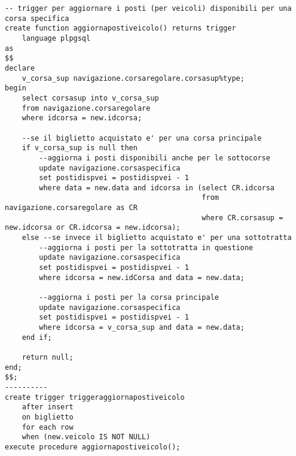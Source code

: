 \begin{lstlisting}[style = sqlstyle]
-- trigger per aggiornare i posti (per veicoli) disponibili per una corsa specifica
create function aggiornapostiveicolo() returns trigger
    language plpgsql
as
$$
declare
    v_corsa_sup navigazione.corsaregolare.corsasup%type;
begin
    select corsasup into v_corsa_sup
    from navigazione.corsaregolare
    where idcorsa = new.idcorsa;

    --se il biglietto acquistato e' per una corsa principale 
    if v_corsa_sup is null then
        --aggiorna i posti disponibili anche per le sottocorse
        update navigazione.corsaspecifica
        set postidispvei = postidispvei - 1
        where data = new.data and idcorsa in (select CR.idcorsa
                                              from navigazione.corsaregolare as CR
                                              where CR.corsasup = new.idcorsa or CR.idcorsa = new.idcorsa);
    else --se invece il biglietto acquistato e' per una sottotratta 
        --aggiorna i posti per la sottotratta in questione
        update navigazione.corsaspecifica
        set postidispvei = postidispvei - 1
        where idcorsa = new.idCorsa and data = new.data;

        --aggiorna i posti per la corsa principale
        update navigazione.corsaspecifica
        set postidispvei = postidispvei - 1
        where idcorsa = v_corsa_sup and data = new.data;
    end if;

    return null;
end;
$$;
----------
create trigger triggeraggiornapostiveicolo
    after insert
    on biglietto
    for each row
    when (new.veicolo IS NOT NULL)
execute procedure aggiornapostiveicolo();
\end{lstlisting}

